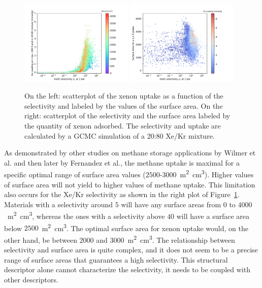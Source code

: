 \documentclass[main.tex]{subfiles}
\begin{document}
\begin{figure}[ht!]
  \centering
  \includegraphics[width=0.48\textwidth]{figures/2-thermo/Scatterplot_uptake_selectivity_sa.pdf}
  \includegraphics[width=0.48\textwidth]{figures/2-thermo/Scatterplot_sa_selectivity.pdf}
  \caption{On the left: scatterplot of the xenon uptake as a function of the selectivity and labeled by the values of the surface area. On the right: scatterplot of the selectivity and the surface area labeled by the quantity of xenon adsorbed. The selectivity and uptake are calculated by a GCMC simulation of a 20:80 Xe/Kr mixture.}\label{fgr:sa}
\end{figure}

As demonstrated by other studies on methane storage applications by Wilmer et al.\autocite{Wilmer_2012} and then later by Fernandez et al.\autocite{Fernandez_2013}, the methane uptake is maximal for a specific optimal range of surface area values ($2500$-$3000$~\si{\square\meter\cubic\centi\meter}). Higher values of surface area will not yield to higher values of methane uptake. This limitation also occurs for the Xe/Kr selectivity as shown in the right plot of Figure~\ref{fgr:sa}. Materials with a selectivity around $5$ will have any surface areas from $0$ to $4000$~\si{\square\meter\cubic\centi\meter}, whereas the ones with a selectivity above $40$ will have a surface area below $2500$~\si{\square\meter\cubic\centi\meter}. The optimal surface area for xenon uptake would, on the other hand, be between $2000$ and $3000$~\si{\square\meter\cubic\centi\meter}. The relationship between selectivity and surface area is quite complex, and it does not seem to be a precise range of surface areas that guarantees a high selectivity. This structural descriptor alone cannot characterize the selectivity, it needs to be coupled with other descriptors. 
\end{document}
